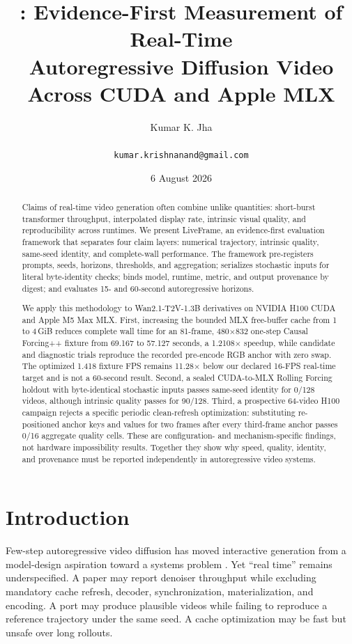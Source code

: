 \documentclass[10pt,twocolumn]{article}
\title{\system: Evidence-First Measurement of Real-Time\\Autoregressive Diffusion Video Across CUDA and Apple MLX}
\author{Kumar K. Jha\\\todoauthor\\\texttt{kumar.krishnanand@gmail.com}}
\date{6 August 2026}
\newcommand{\system}{LiveFrame}
\begin{document}
\maketitle

\begin{abstract}
Claims of real-time video generation often combine unlike quantities: short-burst transformer throughput, interpolated display rate, intrinsic visual quality, and reproducibility across runtimes. We present \system, an evidence-first evaluation framework that separates four claim layers: numerical trajectory, intrinsic quality, same-seed identity, and complete-wall performance. The framework pre-registers prompts, seeds, horizons, thresholds, and aggregation; serializes stochastic inputs for literal byte-identity checks; binds model, runtime, metric, and output provenance by digest; and evaluates 15- and 60-second autoregressive horizons.

We apply this methodology to Wan2.1-T2V-1.3B derivatives on NVIDIA H100 CUDA and Apple M5 Max MLX. First, increasing the bounded MLX free-buffer cache from 1 to 4\,GiB reduces complete wall time for an 81-frame, 480$\times$832 one-step Causal Forcing++ fixture from 69.167 to 57.127 seconds, a 1.2108$\times$ speedup, while candidate and diagnostic trials reproduce the recorded pre-encode RGB anchor with zero swap. The optimized 1.418 fixture FPS remains 11.28$\times$ below our declared 16-FPS real-time target and is not a 60-second result. Second, a sealed CUDA-to-MLX Rolling Forcing holdout with byte-identical stochastic inputs passes same-seed identity for 0/128 videos, although intrinsic quality passes for 90/128. Third, a prospective 64-video H100 campaign rejects a specific periodic clean-refresh optimization: substituting re-positioned anchor keys and values for two frames after every third-frame anchor passes 0/16 aggregate quality cells. These are configuration- and mechanism-specific findings, not hardware impossibility results. Together they show why speed, quality, identity, and provenance must be reported independently in autoregressive video systems.
\end{abstract}

\section{Introduction}
Few-step autoregressive video diffusion has moved interactive generation from a model-design aspiration toward a systems problem \cite{wan,causalforcing,causalforcingpp,rollingforcing}. Yet ``real time'' remains underspecified. A paper may report denoiser throughput while excluding mandatory cache refresh, decoder, synchronization, materialization, and encoding. A port may produce plausible videos while failing to reproduce a reference trajectory under the same seed. A cache optimization may be fast but unsafe over long rollouts.
\end{document}
